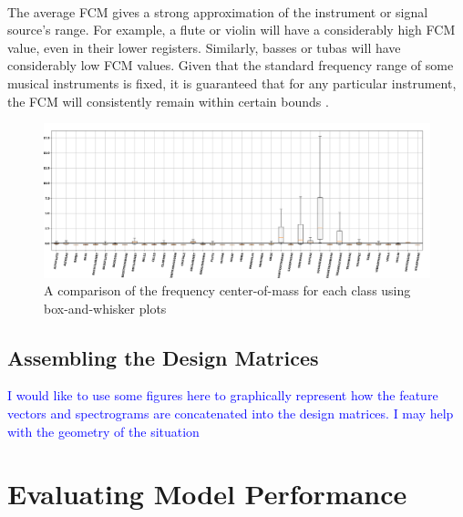 \documentclass[12pt,letterpaper]{article}
\begin{document}
\paragraph*{}The average FCM gives a strong approximation of the instrument or signal source's range. For example, a flute or violin will have a considerably high FCM value, even in their lower registers. Similarly, basses or tubas will have considerably low FCM values. Given that the standard frequency range of some musical instruments is fixed, it is guaranteed that for any particular instrument, the FCM will consistently remain within certain bounds \cite{Olson,White}.

\begin{figure}[H]
\label{fig-FeatureFCM}
\begin{center}
\includegraphics[scale=0.3]{../FiguresFeatures/Frequency_Center_of_Mass}
\end{center}
\caption{A comparison of the frequency center-of-mass for each class using box-and-whisker plots}
\end{figure}


\subsection{Assembling the Design Matrices}
\label{subsec-AssembleXs}

\textcolor{blue}{I would like to use some figures here to graphically represent how the feature vectors and spectrograms are concatenated into the design matrices. I may help with the geometry of the situation}




\newpage
\section{Evaluating Model Performance}
\label{sec-PerfEval}
\end{document}
